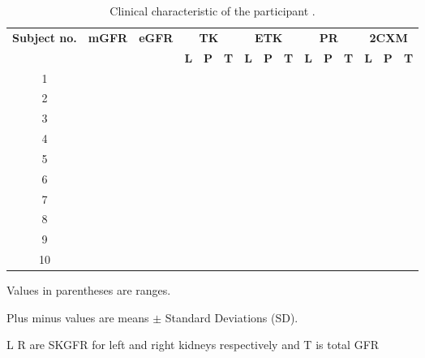 \begin{landscape}
\begin{table}
\centering
\caption[Clinical characteristic of the participants]{Clinical characteristic of the participant \cite{eikefjord2017dynamic}.}
\label{tab:results}
\begin{threeparttable}
\renewcommand{\arraystretch}{1.25}
\begin{tabular}{c c c c c c c c c c c c c c c}
	\toprule
	\multirow{2}{*}{\textbf{Subject no.}}&
	\multirow{2}{*}{\textbf{mGFR}}&
	\multirow{2}{*}{\textbf{eGFR}}&
	\multicolumn{3}{c}{\textbf{TK}} &
    \multicolumn{3}{c}{\textbf{ETK}} &
    \multicolumn{3}{c}{\textbf{PR}}&
    \multicolumn{3}{c}{\textbf{2CXM}}\\
    &&& \textbf{L} & \textbf{P} & \textbf{T}  & \textbf{L} & \textbf{P} & \textbf{T} & \textbf{L} & \textbf{P} & \textbf{T} & \textbf{L} & \textbf{P} & \textbf{T}\\ 
    \hline
    
  	1 &&&&&&&&&&&&&&\\
  	2 &&&&&&&&&&&&&&\\
  	3 &&&&&&&&&&&&&&\\
  	4 &&&&&&&&&&&&&&\\
  	5 &&&&&&&&&&&&&&\\
  	6 &&&&&&&&&&&&&&\\
  	7 &&&&&&&&&&&&&&\\
  	8 &&&&&&&&&&&&&&\\
  	9 &&&&&&&&&&&&&&\\
  	10 &&&&&&&&&&&&&&\\

  \bottomrule

\end{tabular}
\begin{tablenotes}%
\footnotesize{}%
\item Values in parentheses are ranges.
\item Plus minus values are means $\pm$ Standard Deviations (SD).
\item L R are SKGFR for left and right kidneys respectively and T is total GFR
    \end{tablenotes}
	\end{threeparttable}
\end{table}
\end{landscape}